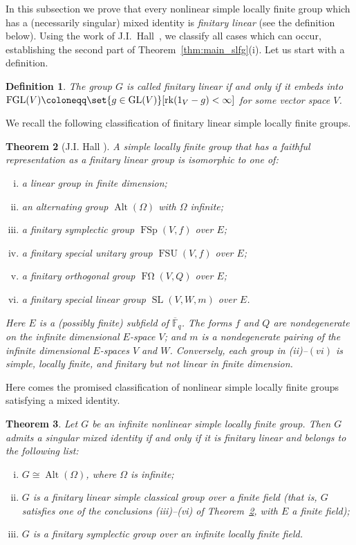 \documentclass[a4paper,12pt]{amsproc}
\DeclareMathOperator{\GL}{GL}%
\DeclareMathOperator{\rk}{rk}%
\DeclareMathOperator{\SL}{SL}%
\DeclareMathOperator{\Alt}{Alt}%
\DeclareMathOperator{\FGL}{FGL}%
\DeclareMathOperator{\FSp}{FSp}%
\DeclareMathOperator{\FOmega}{F\Omega}%
\DeclareMathOperator{\FSU}{FSU}%
\theoremstyle{plain}
\newtheorem{definition}{Definition}[section]
\newtheorem{theorem}[definition]{Theorem}
\theoremstyle{definition}
\begin{document}
In this subsection we prove that every nonlinear simple locally finite group which has a (necessarily singular) mixed identity is \emph{finitary linear} (see the definition below). Using the work of J.I.\ Hall~\cite{hall2006periodic}, we classify all cases which can occur, establishing the second part of Theorem~\ref{thm:main_slfg}(i). Let us start with a definition.

\begin{definition}\label{def:ftry_lin}
The group $G$ is called \emph{finitary linear} if and only if it embeds into $\FGL(V)\coloneqq\set{g\in\GL(V)}[\rk(1_V-g)<\infty]$ for some vector space $V$.
\end{definition}

We recall the following classification of finitary linear simple locally finite groups.

\begin{theorem}[J.I. Hall \cite{hall2006periodic}]\label{thm:hall}
A simple locally finite group that has a faithful representation as a finitary linear group is isomorphic to one of:
\begin{enumerate}[(i)]
\item a linear group in finite dimension;
\item an alternating group $\Alt(\Omega)$ with $\Omega$ infinite;
\item a finitary symplectic group $\FSp(V,f)$ over $E$;
\item a finitary special unitary group $\FSU(V,f)$ over $E$;
\item a finitary orthogonal group $\FOmega(V,Q)$ over $E$;
\item a finitary special linear group $\SL(V,W,m)$ over $E$.
\end{enumerate}

Here $E$ is a (possibly finite) subfield of $\overline{\mathbb{F}}_q$. The forms $f$ and $Q$ are nondegenerate on the infinite dimensional $E$-space $V$; and $m$ is a nondegenerate pairing of the infinite dimensional $E$-spaces $V$ and $W$. Conversely, each group in (ii)--$(vi)$ is simple, locally finite, and finitary but not linear in finite dimension.
\end{theorem}

Here comes the promised classification of nonlinear simple locally finite groups satisfying a mixed identity.

\begin{theorem}\label{thm:class_sing_mxd_id}
Let $G$ be an infinite nonlinear simple locally finite group. Then $G$ admits a singular mixed identity if and only if it is finitary linear and belongs to the following list:
\begin{enumerate}[(i)]
\item $G\cong \Alt(\Omega)$, where $\Omega$ is infinite;
\item $G$ is a finitary linear simple classical group over a finite field 
(that is, $G$ satisfies one of the conclusions (iii)--(vi) of Theorem~\ref{thm:hall}, 
with $E$ a finite field);
\item $G$ is a finitary symplectic group over an infinite locally finite field.
\end{enumerate}
\end{theorem}
\end{document}
